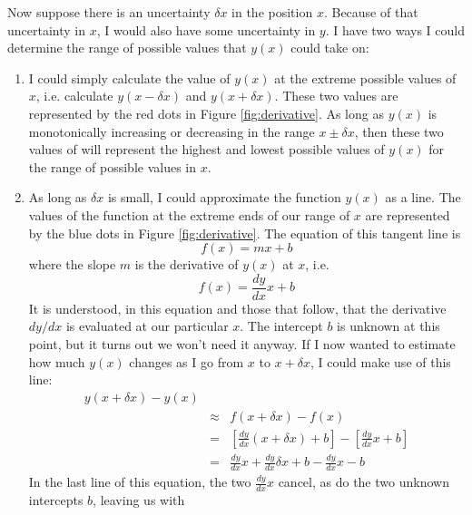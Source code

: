 Now suppose there is an uncertainty $\delta x$ in the position $x$.
Because of that uncertainty in $x$, I would also have some uncertainty in $y$.
I have two ways I could determine the range of possible values that
$y(x)$ could take on:
\begin{enumerate}
    \item I could simply calculate the value of $y(x)$ at the extreme possible
        values of $x$, i.e. calculate $y(x-\delta x)$ and $y(x+\delta x)$.
        These two values are represented by the red dots in 
        Figure \ref{fig:derivative}. As long as $y(x)$ is monotonically 
        increasing or decreasing in the range $x\pm\delta x$, then these 
        two values of will represent the highest and lowest possible values 
        of $y(x)$ for the range of possible values in $x$.
    \item As long as $\delta x$ is small, I could approximate the function 
        $y(x)$ as a line. The values of the function at the extreme ends of 
        our range of $x$ are represented by the blue dots in Figure 
        \ref{fig:derivative}.
        The equation of this tangent line is 
        \begin{equation}
            f(x)=mx+b
        \end{equation}
        where the slope $m$ is the derivative of $y(x)$ at $x$, i.e.
        \begin{equation}
            f(x)=\frac{dy}{dx}x+b
        \end{equation}
        It is understood, in this equation and those that follow, that the 
        derivative $dy/dx$ is evaluated at our particular $x$.
        The intercept $b$ is unknown at this point, but it turns out we won't 
        need it anyway. If I now wanted to estimate how much $y(x)$ changes
        as I go from $x$ to $x+\delta x$, I
        could make use of this line:
        \begin{eqnarray*}
            y(x+\delta x)-y(x) \\
            &\approx&
            f(x+\delta x)-f(x) \\
            &=&
            \left[\frac{dy}{dx}(x+\delta x)+b\right]-
            \left[\frac{dy}{dx}x+b\right]\\
            &=&
            \frac{dy}{dx}x + 
            \frac{dy}{dx}\delta x + b -
            \frac{dy}{dx}x - b
        \end{eqnarray*}
        In the last line of this equation, the two
        $\frac{dy}{dx}x$ cancel, as do the two 
        unknown intercepts $b$, leaving us with

\end{enumerate}
